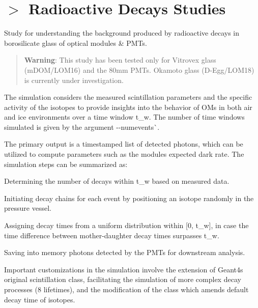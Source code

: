 \chapter{\texorpdfstring{$>$}{>} Radioactive Decays Studies}
\hypertarget{md_extra__doc_231__radioactive__decays}{}\label{md_extra__doc_231__radioactive__decays}
\label{md_extra__doc_231__radioactive__decays_autotoc_md44}%
%
 Study for understanding the background produced by radioactive decays in borosilicate glass of optical modules \& PMTs.

\begin{quote}
{\bfseries{Warning}}\+: This study has been tested only for Vitrovex glass (m\+DOM/\+LOM16) and the 80mm  PMTs. Okamoto glass (D-\/\+Egg/\+LOM18) is currently under investigation. \end{quote}
The simulation considers the measured scintillation parameters and the specific activity of the isotopes to provide insights into the behavior of OMs in both air and ice environments over a time window t\+\_\+w. The number of time windows simulated is given by the argument {\ttfamily -\/-\/numevents}\`{}.

The primary output is a timestamped list of detected photons, which can be utilized to compute parameters such as the module\textquotesingle{}s expected dark rate. The simulation steps can be summarized as\+:


\begin{DoxyItemize}
\item Determining the number of decays within t\+\_\+w based on measured data.
\item Initiating decay chains for each event by positioning an isotope randomly in the pressure vessel.
\item Assigning decay times from a uniform distribution within \mbox{[}0, t\+\_\+w\mbox{]}, in case the time difference between mother-\/daughter decay times surpasses t\+\_\+w.
\item Saving into memory photons detected by the PMTs for downstream analysis.
\end{DoxyItemize}

Important customizations in the simulation involve the extension of Geant4\textquotesingle{}s original scintillation class, facilitating the simulation of more complex decay processes (8 lifetimes), and the modification of the  class which amends default decay time of isotopes.


